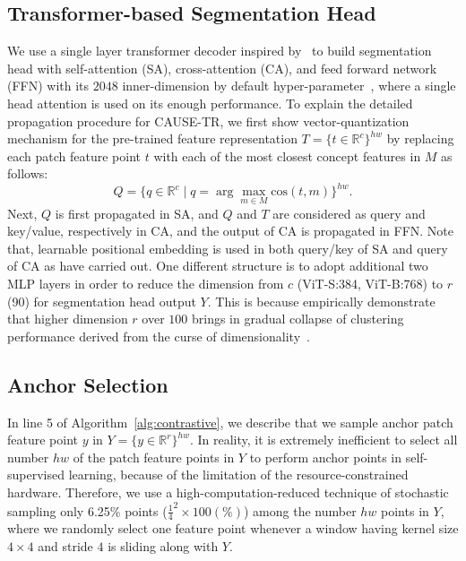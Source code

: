 \documentclass{article} \usepackage{iclr2024_conference,times}
\begin{document}
\subsection{Transformer-based Segmentation Head}

We use a single layer transformer decoder inspired by~\citet{vaswani2017attention, carion2020end} to build segmentation head with self-attention (SA), cross-attention (CA), and feed forward network (FFN) with its $2048$ inner-dimension by default hyper-parameter~\citep{vaswani2017attention}, where a single head attention is used on its enough performance. To explain the detailed propagation procedure for CAUSE-TR, we first show vector-quantization mechanism for the pre-trained feature representation $T=\{t\in\mathbb{R}^{c}\}^{hw}$ by replacing each patch feature point $t$ with each of the most closest concept features in $M$ as follows:
\begin{equation}
    Q=\{q\in\mathbb{R}^{c} \mid q=\arg\max_{m\in M}\text{cos}(t, m)\}^{hw}.
\end{equation}
Next, $Q$ is first propagated in SA, and $Q$ and $T$ are considered as query and key/value, respectively in CA, and the output of CA is propagated in FFN. Note that, learnable positional embedding is used in both query/key of SA and query of CA as \citet{carion2020end} have carried out. One different structure is to adopt additional two MLP layers in order to reduce the dimension from $c$ (ViT-S:384, ViT-B:768) to $r$ (90) for segmentation head output $Y$. This is because \citet{koenig2023uncovering} empirically demonstrate that higher dimension $r$ over $100$ brings in gradual collapse of clustering performance derived from the curse of dimensionality~\citep{assent2012clustering}.

\subsection{Anchor Selection}

In line 5 of Algorithm~\ref{alg:contrastive}, we describe that we sample anchor patch feature point $y$ in $Y=\{y\in\mathbb{R}^r\}^{hw}$. In reality, it is extremely inefficient to select all number $hw$ of the patch feature points in $Y$ to perform anchor points in self-supervised learning, because of the limitation of the resource-constrained hardware. Therefore, we use a high-computation-reduced technique of stochastic sampling only 6.25\% points ($\frac{1}{4}^2\times 100 (\%)$) among the number $hw$ points in $Y$, where we randomly select one feature point whenever a window having kernel size $4\times 4$ and stride $4$ is sliding along with $Y$.
\end{document}
